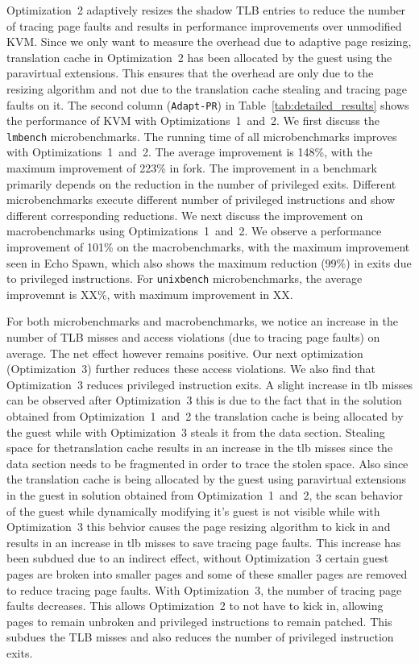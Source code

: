 Optimization~2 adaptively resizes the shadow TLB entries to reduce the number of tracing page faults and results in performance improvements over unmodified KVM. Since we only want to measure the overhead due to adaptive page resizing, translation cache in Optimization~2 has been allocated by the guest using the paravirtual extensions. This ensures that the overhead are only due to the resizing algorithm and not due to the translation cache stealing and tracing page faults on it. The second column ({\tt Adapt-PR}) in Table~\ref{tab:detailed_results} shows the performance of KVM with Optimizations~1~and~2. We first discuss the {\tt lmbench} microbenchmarks. The running time of all microbenchmarks improves with Optimizations~1~and~2. The average improvement is 148\%, with the maximum improvement of 223\% in fork. The improvement in a benchmark primarily depends on the reduction in the number of privileged exits. Different microbenchmarks execute different number of privileged instructions and show different corresponding reductions. We next discuss the improvement on macrobenchmarks using Optimizations~1~and~2. We observe a performance improvement of 101\% on the macrobenchmarks, with the maximum improvement seen in Echo Spawn, which also shows the maximum reduction (99\%) in exits due to privileged instructions. For {\tt unixbench} microbenchmarks, the average improvemnt is XX\%, with maximum improvement in XX. 

For both microbenchmarks and macrobenchmarks, we notice an increase in the number of TLB misses and access violations (due to tracing page faults) on average. The net effect however remains positive. Our next optimization (Optimization~3) further reduces these access violations. We also find that Optimization~3 reduces privileged instruction exits. A slight increase in tlb misses can be observed after Optimization~3 this is due to the fact that in the solution obtained from Optimization~1~and~2  the translation cache is being allocated by the guest while with Optimization~3 steals it from the data section. Stealing space for thetranslation cache results in an increase in the tlb misses since the data section needs to be fragmented in order to trace the stolen space. Also since the translation cache is being allocated by the guest using paravirtual extensions in the guest in solution obtained from Optimization~1~and~2, the scan behavior of the guest while dynamically modifying it's guest is not visible while with Optimization~3 this behvior causes the page resizing algorithm to kick in and results in an increase in tlb misses to save tracing page faults.
This increase has been subdued due to an indirect effect, without Optimization~3 certain guest pages are broken into smaller pages and some of these smaller pages are removed to reduce tracing page faults. With Optimization~3, the number of tracing page faults decreases. This allows Optimization~2 to not have to kick in, allowing pages to remain unbroken and privileged instructions to remain patched. This subdues the TLB misses and also reduces the number of privileged instruction exits. 

